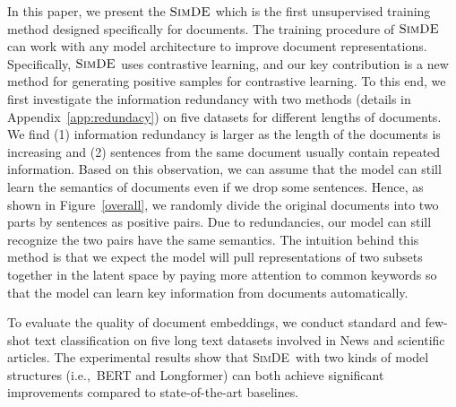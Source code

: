 \documentclass[11pt]{article}
\newcommand{\our}{\mbox{\textsc{SimDE}}}
\begin{document}
In this paper, we present the $\our$ which is the first unsupervised training method designed specifically for documents.
The training procedure of $\our$ can work with any model architecture to improve document representations. 
Specifically, $\our$ uses contrastive learning,
and our key contribution is a new method for generating positive samples for contrastive learning.
To this end, we first investigate the information redundancy with two methods (details in Appendix~\ref{app:redundacy}) on five datasets for different lengths of documents.
We find (1) information redundancy is larger as the length of the documents is increasing and (2) sentences from the same document usually contain repeated information. 
Based on this observation, we can assume that the model can still learn the semantics of documents even if we drop some sentences. Hence, as shown in Figure~\ref{overall}, we randomly divide the original documents into two parts by sentences as positive pairs. Due to redundancies, our model can still recognize the two pairs have the same semantics. 
The intuition behind this method is that we expect the model will pull representations of two subsets together in the latent space by paying more attention to common keywords so that the model can learn key information from documents automatically. 

To evaluate the quality of document embeddings, we conduct standard and few-shot text classification on five long text datasets involved in News and scientific articles. 
The experimental results show that \our~with two kinds of model structures (i.e.,~BERT and Longformer) can both achieve significant improvements compared to state-of-the-art baselines.
\end{document}
